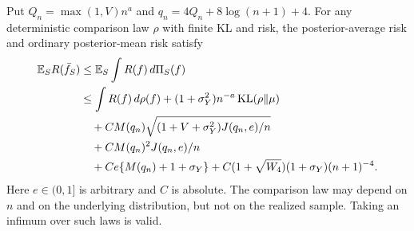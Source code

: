\begin{theorem}
\label{thm:raw-sieve-oracle}
Put $Q_n=\max(1,V)n^a$ and
$q_n=4Q_n+8\log(n+1)+4$. For any deterministic comparison law $\rho$
with finite KL and risk, the posterior-average risk and ordinary
posterior-mean risk satisfy
\begin{align}
 \mathbb E_S R(\bar f_S)
 &\le\mathbb E_S\int R(f)\,d\Pi_S(f)\\
 &\le\int R(f)\,d\rho(f)
       +(1+\sigma_Y^2)n^{-a}\operatorname{KL}(\rho\Vert\mu)\notag\\
 &\quad+C M(q_n)\sqrt{(1+V+\sigma_Y^2)J(q_n,e)/n}\notag\\
 &\quad+C M(q_n)^2J(q_n,e)/n\notag\\
 &\quad+Ce\{M(q_n)+1+\sigma_Y\}
       +C(1+\sqrt{W_4})(1+\sigma_Y)(n+1)^{-4}.
 \label{eq:raw-sieve-oracle}
\end{align}
Here $e\in(0,1]$ is arbitrary and $C$ is absolute. The comparison law
may depend on $n$ and on the underlying distribution, but not on the
realized sample. Taking an infimum over such laws is valid.
\end{theorem}
